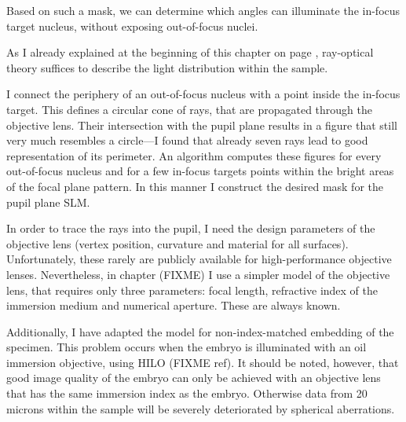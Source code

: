 Based on such a mask, we can determine which angles can illuminate the
in-focus target nucleus, without exposing out-of-focus nuclei.

As I already explained at the beginning of this chapter on page
\pageref{sec:ray-valid}, ray-optical theory suffices to describe the
light distribution within the sample.

I connect the periphery of an out-of-focus nucleus with a point inside
the in-focus target. This defines a circular cone of rays, that are
propagated through the objective lens. Their intersection with the
pupil plane results in a figure that still very much resembles a
circle---I found that already seven rays lead to good representation
of its perimeter.  An algorithm computes these figures for every
out-of-focus nucleus and for a few in-focus targets points within the
bright areas of the focal plane pattern. In this manner I construct
the desired mask for the pupil plane SLM.

In order to trace the rays into the pupil, I need the design
parameters of the objective lens (vertex position, curvature and
material for all surfaces). Unfortunately, these rarely are publicly
available for high-performance objective lenses. Nevertheless, in
chapter (FIXME) I use a simpler model of the objective lens, that
requires only three parameters: focal length, refractive index of the
immersion medium and numerical aperture. These are always known.

Additionally, I have adapted the model for non-index-matched embedding
of the specimen. This problem occurs when the embryo is illuminated
with an oil immersion objective, using HILO (FIXME ref). It should be
noted, however, that good image quality of the embryo can only be
achieved with an objective lens that has the same immersion index as
the embryo. Otherwise data from 20 microns within the sample will be
severely deteriorated by spherical aberrations.
